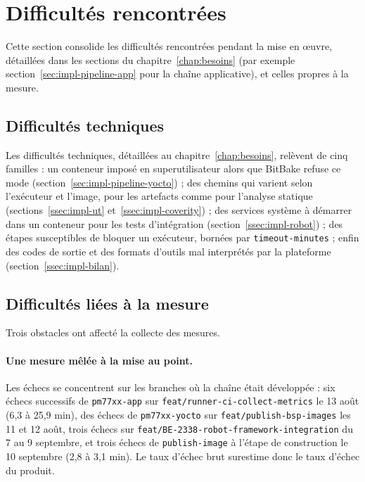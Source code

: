 \section{Difficultés rencontrées}
\label{sec:eval-difficultes}

Cette section consolide les difficultés rencontrées pendant la mise en
œuvre, détaillées dans les sections du chapitre~\ref{chap:besoins}
(par exemple section~\ref{sec:impl-pipeline-app} pour la chaîne applicative), et
celles propres à la mesure.

\subsection{Difficultés techniques}
Les difficultés techniques, détaillées au chapitre~\ref{chap:besoins}, relèvent
de cinq familles : un conteneur imposé en superutilisateur alors que BitBake
refuse ce mode (section~\ref{sec:impl-pipeline-yocto}) ; des chemins qui varient
selon l'exécuteur et l'image, pour les artefacts comme pour l'analyse statique
(sections~\ref{ssec:impl-ut} et~\ref{ssec:impl-coverity}) ; des services
système à démarrer dans un conteneur pour les tests d'intégration
(section~\ref{ssec:impl-robot}) ; des étapes susceptibles de bloquer un
exécuteur, bornées par \texttt{timeout-minutes} ; enfin des codes de sortie et
des formats d'outils mal interprétés par la plateforme
(section~\ref{ssec:impl-bilan}).

\subsection{Difficultés liées à la mesure}
Trois obstacles ont affecté la collecte des mesures.

\paragraph{Une mesure mêlée à la mise au point.} Les échecs se concentrent sur
les branches où la chaîne était développée : six échecs successifs de
\texttt{pm77xx-app} sur \texttt{feat/runner-ci-collect-metrics} le 13 août
(6,3 à 25,9 min), des échecs de \texttt{pm77xx-yocto} sur
\texttt{feat/publish-bsp-images} les 11 et 12 août, trois échecs sur
\texttt{feat/BE-2338-robot-framework-integration} du 7 au 9 septembre, et trois
échecs de \texttt{publish-image} à l'étape de construction le 10 septembre
(2,8 à 3,1 min). Le taux d'échec brut surestime donc le taux d'échec du produit.

